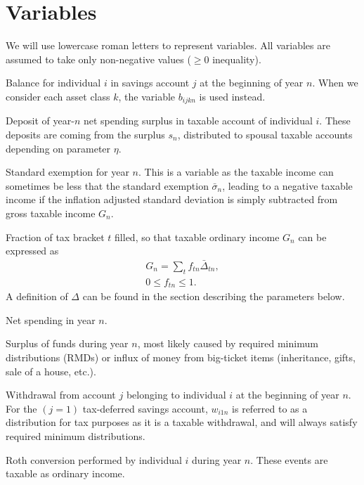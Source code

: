 \documentclass{report}[fleqn,12pt]
\begin{document}
\section{Variables}
We will use lowercase roman letters to represent variables. All variables are assumed
to take only non-negative values ($\ge 0$ inequality).
\begin{description}[leftmargin=4em,style=multiline]
\item [$b_{ijn}$]
	Balance for individual $i$ in savings account $j$ at the beginning of year $n$.
	When we consider each asset class $k$, the variable $b_{ijkn}$ is used instead.
\item [$d_{in}$]
	Deposit of year-$n$ net spending surplus in taxable account of individual $i$.
	These deposits are coming from the surplus $s_n$, distributed to
	spousal taxable accounts depending on parameter $\eta$.
\item [$e_{n}$]
	Standard exemption for year $n$. This is a variable as the taxable income can
        sometimes be less that the standard exemption $\bar{\sigma}_n$, leading to a
	negative taxable income if the inflation adjusted standard deviation is simply subtracted
	from gross taxable income $G_n$.
\item [$f_{t n}$]
	Fraction of tax bracket $t$ filled, so that taxable ordinary income $G_n$ can be expressed as
	\begin{eqnarray}
		\label{Eq:Tx1}
		G_n = \sum_t f_{t n}\bar{\Delta}_{t n},\\
		0 \leq f_{t n} \leq 1.
	\end{eqnarray}
	A definition of $\Delta$ can be found in the section describing the parameters below. 
\item [$g_n$]
	Net spending in year $n$.
\item [$s_{n}$]
	Surplus of funds during year $n$, most likely caused by required minimum distributions (RMDs)
	or influx of money from big-ticket items (inheritance, gifts, sale of a house, etc.).
\item [$w_{ijn}$]
	Withdrawal from account $j$ belonging to individual $i$ at the beginning of year $n$.
	For the $(j=1)$ tax-deferred savings account, $w_{i1n}$ is referred to as a distribution for
	tax purposes as it is a taxable withdrawal, and will always satisfy required minimum distributions.
\item [$x_{in}$]
	Roth conversion performed by individual $i$ during year $n$.
	These events are taxable as ordinary income.
\end{description}
\end{document}
